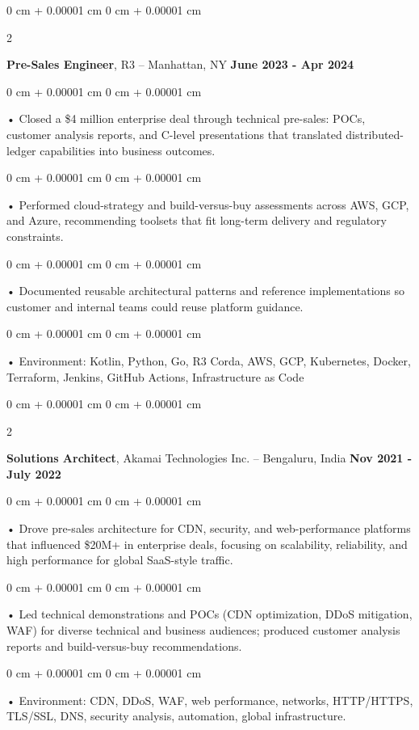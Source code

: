 \documentclass[10pt, letterpaper]{article}
\newenvironment{onecolentry}{
    \begin{adjustwidth}{
        0 cm + 0.00001 cm
    }{
        0 cm + 0.00001 cm
    }
}{
    \end{adjustwidth}
} %
\newenvironment{twocolentry}[2][]{
    \onecolentry
    \def\secondColumn{#2}
    \setcolumnwidth{\fill, 4.5 cm}
    \begin{paracol}{2}
}{
    \switchcolumn \raggedleft \secondColumn
    \end{paracol}
    \endonecolentry
} %
\begin{document}
        \begin{twocolentry}{
            \textbf{June 2023 - Apr 2024}
        }
            \textbf{Pre-Sales Engineer}, R3 -- Manhattan, NY\end{twocolentry}


        \begin{onecolentry}
             • Closed a \$4 million enterprise deal through technical pre-sales: POCs, customer analysis reports, and C-level presentations that translated distributed-ledger capabilities into business outcomes.
        \end{onecolentry}
        \begin{onecolentry}
             • Performed cloud-strategy and build-versus-buy assessments across AWS, GCP, and Azure, recommending toolsets that fit long-term delivery and regulatory constraints.
        \end{onecolentry}
        \begin{onecolentry}
             • Documented reusable architectural patterns and reference implementations so customer and internal teams could reuse platform guidance.
        \end{onecolentry}
        \begin{onecolentry}
             • Environment: Kotlin, Python, Go, R3 Corda, AWS, GCP, Kubernetes, Docker, Terraform, Jenkins, GitHub Actions, Infrastructure as Code
        \end{onecolentry}
        \vspace{0.1cm}

        \begin{twocolentry}{
            \textbf{Nov 2021 - July 2022}
        }
            \textbf{Solutions Architect}, Akamai Technologies Inc. -- Bengaluru, India \end{twocolentry}
        \begin{onecolentry}
            • Drove pre-sales architecture for CDN, security, and web-performance platforms that influenced \$20M+ in enterprise deals, focusing on scalability, reliability, and high performance for global SaaS-style traffic.
        \end{onecolentry}
        \begin{onecolentry}
            • Led technical demonstrations and POCs (CDN optimization, DDoS mitigation, WAF) for diverse technical and business audiences; produced customer analysis reports and build-versus-buy recommendations.
        \end{onecolentry}
        \begin{onecolentry}
             • Environment: CDN, DDoS, WAF, web performance, networks, HTTP/HTTPS, TLS/SSL, DNS, security analysis, automation, global infrastructure.
        \end{onecolentry}
\end{document}
